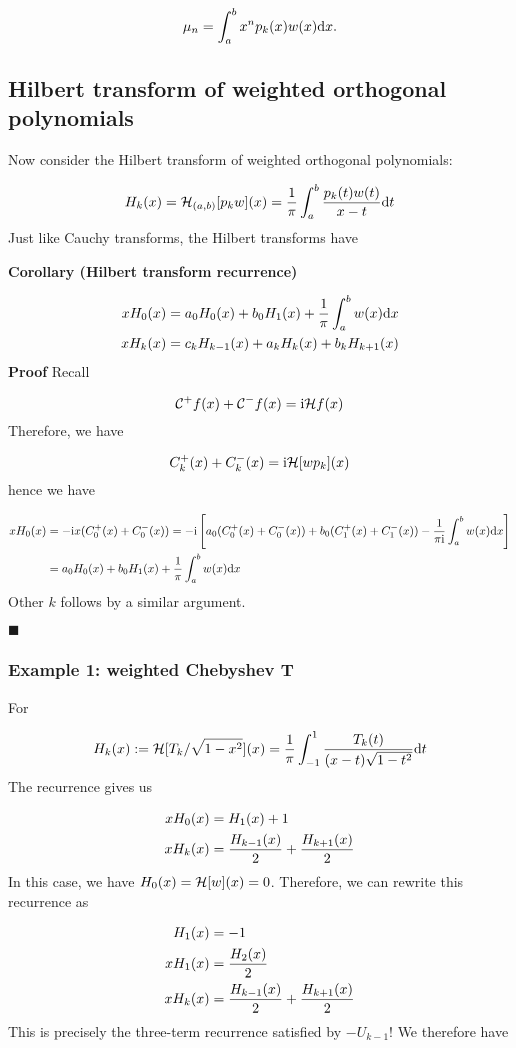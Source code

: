 \documentclass[12pt,a4paper]{article}
\def\D{ {\rm d} }
\def\I{ {\rm i} }
\def\CC{ {\cal C} }
\def\HH{ {\cal H} }
\def\dx{\D x}
\def\dt{\D t}
\begin{document}
\[
\mu_n = \int_{a}^{b} x^n p_k(x)w(x) \D x.
\]
\subsection{Hilbert transform of weighted orthogonal polynomials}
Now consider the Hilbert transform of weighted orthogonal polynomials:

\[
H_k(x) = \HH_{(a,b)}[p_k w](x) = {1 \over \pi} \int_a^b {p_k(t) w(t) \over x-t} \dt
\]
Just like Cauchy transforms, the Hilbert transforms have

\textbf{Corollary (Hilbert transform recurrence)}


\begin{align*}
x H_0(x) &=  a_0 H_0(x) + b_0 H_1(x) + {1 \over \pi} \int_a^b w(x) \dx\\
x H_k(x) &=  c_k H_{k-1}(x) + a_k H_k(x) + b_k H_{k+1}(x)
\end{align*}
\textbf{Proof} Recall

\[
\CC^+ f(x) + \CC^- f(x) = \I \HH f(x)
\]
Therefore, we have

\[
C_k^+(x) + C_k^-(x) = \I \HH[w p_k](x)
\]
hence we have


\begin{align*}
x H_0(x) &= -\I x (C_0^+(x) + C_0^-(x)) = - \I \left[a_0 (C_0^+(x) + C_0^-(x)) + b_0 (C_1^+(x) + C_1^-(x))    -{1 \over  \pi \I} \int_a^b w(x) \dx \right]\\
            &=  a_0 H_0(x) + b_0 H_1(x) + {1 \over \pi} \int_a^b w(x) \dx
\end{align*}
Other $k$ follows by a similar argument.

\ensuremath{\blacksquare}

\subsubsection{Example 1: weighted Chebyshev T}
For

\[
H_k(x) := \HH[T_k/\sqrt{1-x^2}](x) =  {1 \over \pi} \int_{-1}^1 {T_k(t) \over (x-t)\sqrt{1-t^2}} \dt
\]
The recurrence gives us


\begin{align*}
x H_0(x) &= H_1(x) + 1 \\
x H_k(x) &= {H_{k-1}(x) \over 2} + {H_{k+1}(x) \over 2} \\
\end{align*}
In this case, we have $H_0(x) = \HH[w](x) =  0$. Therefore, we can rewrite this recurrence as


\begin{align*}
H_1(x)&= -1  \\
x H_1(x) &= {H_2(x) \over 2} \\
x H_k(x) &= {H_{k-1}(x) \over 2} + {H_{k+1}(x) \over 2} \\
\end{align*}
This is precisely the three-term recurrence satisfied by $-U_{k-1}$! We therefore have
\end{document}

